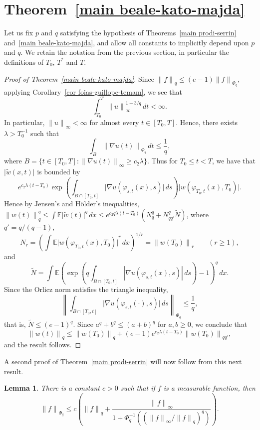 \documentclass[12pt]{amsart}
\newtheorem{lemma}[thm]{Lemma}
\theoremstyle{remark}
\newcommand{\E}{{\mathbb E}}
\newcommand{\modo}[1]{{\left|#1\right|}}
\newcommand{\normo}[1]{{\left\|#1\right\|}}
\newcommand{\smodo}[1]{{\mathopen|#1\mathclose|}}
\newcommand{\snormo}[1]{{\mathopen\|#1\mathclose\|}}
\begin{document}
\section{Theorem~\ref{main beale-kato-majda}}

Let us fix $p$ and $q$ satisfying the hypothesis of 
Theorems~\ref{main prodi-serrin} and~\ref{main beale-kato-majda}, 
and allow all constants to implicitly depend upon $p$ and $q$.
We retain the notation from the previous section, in particular the 
definitions of $T_0$, $T^*$ and $T$.

\begin{proof}[Proof of Theorem~\ref{main beale-kato-majda}]
Since $\snormo f_q \le (e-1)\snormo f_{\Phi_q}$, applying 
Corollary~\ref{cor foias-guillope-temam},
we see that
$$ \int_{T_0}^T \snormo u_\infty^{1-3/q} \, dt < \infty .$$
In particular, $\snormo u_\infty < \infty$ for almost every $t \in [T_0,T]$.
Hence, there exists $\lambda>T_0^{-1}$ such
that
$$ \int_{B}
   \snormo{\nabla u(t)}_{\Phi_q} \, dt \le \frac1q ,$$
where 
$B = \{t \in [T_0,T] \colon \snormo{\nabla u(t)}_\infty \ge c_2 \lambda\}$.
Thus for $T_0 \le t < T$, we have that $\smodo{\tilde w(x,t)}$ is bounded
by
$$ e^{c_2 \lambda (t-T_0)}
   \exp\left(\int_{B\cap[T_0,t]} 
   \smodo{\nabla u(\varphi_{s,t}(x),s)} \, ds\right)
   \smodo{w(\varphi_{T_0,t}(x),T_0)} .$$
Hence by Jensen's and
H\"older's inequalities, $\snormo{w(t)}_{q}^{q} \le 
\int \E\smodo{\tilde w(t)}^{q} \, dx \le 
e^{c_2 q \lambda (t-T_0)}(N_q^q + N_{qq'}^q \tilde N)$, where
$q' = q/(q-1)$, 
$$
   N_r
   =
   \left(\int \E \smodo{w(\varphi_{T_0,t}(x),T_0)}^r\,dx\right)^{1/r} 
   = \snormo{w(T_0)}_r \qquad (r \ge 1), $$
and
$$
   \tilde N
   =
   \int \E \left(
   \exp\left(q\int_{B \cap [T_0,t]}
   \modo{\nabla u(\varphi_{s,t}(x),s)} \, ds \right) - 1 \right)^q
   \, dx .
$$
Since the Orlicz norm satisfies the triangle inequality, 
$$ \normo{\int_{B\cap[T_0,t]} \smodo{\nabla u(\varphi_{s,t}(\cdot),s)} \, ds}
    _{\Phi_q} \le \frac1q ,$$
that is, $\tilde N \le (e-1)^q $.
Since $a^q + b^q \le (a+b)^q$ for $a,b \ge 0$,
we conclude that 
$$ \snormo{w(t)}_q \le \snormo{w(T_0)}_q + 
   (e-1) e^{c_2 \lambda (t-T_0)} \snormo{w(T_0)}_{qq'} ,$$
and the result follows.
\end{proof}

A second proof of Theorem~\ref{main prodi-serrin} will now follow from
this next result.

\begin{lemma}  \label{upper bound for L_Phi}
There is a constant $c>0$ such that if $f$ is a measurable
function, then
$$
  \snormo f_{\Phi_q} \le c
  \left(\snormo f_q + 
  \frac{\snormo f_\infty}{1+\Phi_q^{-1}(({\snormo f_\infty}/{\snormo f_q})^q)}
  \right) .$$
\end{lemma}
\end{document}
